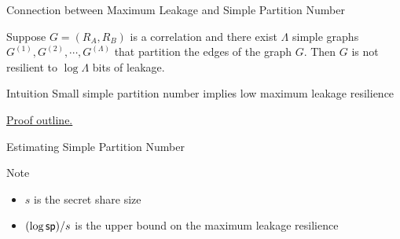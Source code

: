 \begin{frame}{Connection between Maximum Leakage and Simple Partition Number}
	\begin{lemma}
		Suppose $ G = (R_A, R_B) $ is a correlation and there exist $\Lambda$ simple graphs $ G^{(1)}, G^{(2)}, \cdots, G^{(\Lambda)} $ that partition the edges of the graph $ G $. 
		Then $ G $ is not resilient to $ \log \Lambda $ bits of leakage.
	\end{lemma}
	\pause
	
	\begin{block}{Intuition}
		Small simple partition number implies low maximum leakage resilience
	\end{block}
	\pause
	\underline{Proof outline.} 

\end{frame}

\begin{frame}{Estimating Simple Partition Number}
	
	{
		\begin{block}{Note}
			\begin{itemize}
				\item $ s $ is the secret share size
				\item $ (\log \mathsf{sp})/s $ is the upper bound on the maximum leakage resilience
			\end{itemize}
		\end{block}
	}
\end{frame}

